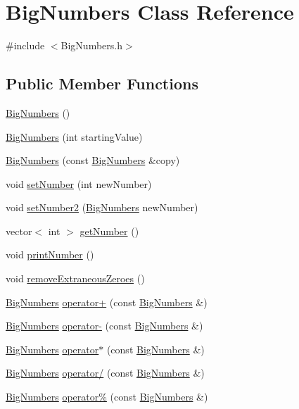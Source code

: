 \hypertarget{class_big_numbers}{}\section{Big\+Numbers Class Reference}
\label{class_big_numbers}


{\ttfamily \#include $<$Big\+Numbers.\+h$>$}

\subsection*{Public Member Functions}
\begin{DoxyCompactItemize}
\item 
\mbox{\hyperlink{class_big_numbers_af3dd82883f10f3473ac83280f26b0ad8}{Big\+Numbers}} ()
\item 
\mbox{\hyperlink{class_big_numbers_ae05f731eabe0a6a24e6a2a446bc6e494}{Big\+Numbers}} (int starting\+Value)
\item 
\mbox{\hyperlink{class_big_numbers_a5722d1b8b8e1b793bca0aa8da14e0c64}{Big\+Numbers}} (const \mbox{\hyperlink{class_big_numbers}{Big\+Numbers}} \&copy)
\item 
void \mbox{\hyperlink{class_big_numbers_abf400d0630712c0894101f578960b155}{set\+Number}} (int new\+Number)
\item 
void \mbox{\hyperlink{class_big_numbers_a6b9f005b46c0112d7fff0a5bc685b095}{set\+Number2}} (\mbox{\hyperlink{class_big_numbers}{Big\+Numbers}} new\+Number)
\item 
vector$<$ int $>$ \mbox{\hyperlink{class_big_numbers_ab140c7d7b759d5c27c21103d781c58d6}{get\+Number}} ()
\item 
void \mbox{\hyperlink{class_big_numbers_a1796791f2942db617426897c9cf6d9b7}{print\+Number}} ()
\item 
void \mbox{\hyperlink{class_big_numbers_a91e77188004279bd26af52d1a937c8ca}{remove\+Extraneous\+Zeroes}} ()
\item 
\mbox{\hyperlink{class_big_numbers}{Big\+Numbers}} \mbox{\hyperlink{class_big_numbers_a9571bdce2b62424020c3cd18f8fcd35d}{operator+}} (const \mbox{\hyperlink{class_big_numbers}{Big\+Numbers}} \&)
\item 
\mbox{\hyperlink{class_big_numbers}{Big\+Numbers}} \mbox{\hyperlink{class_big_numbers_ac8b9a03b6c074439aaa29417b743189b}{operator-\/}} (const \mbox{\hyperlink{class_big_numbers}{Big\+Numbers}} \&)
\item 
\mbox{\hyperlink{class_big_numbers}{Big\+Numbers}} \mbox{\hyperlink{class_big_numbers_ab4a10f12b8f3712f4a5d71f5290bc0f9}{operator$\ast$}} (const \mbox{\hyperlink{class_big_numbers}{Big\+Numbers}} \&)
\item 
\mbox{\hyperlink{class_big_numbers}{Big\+Numbers}} \mbox{\hyperlink{class_big_numbers_aee7e1cdae1742cd7b6b1e469e1fda743}{operator/}} (const \mbox{\hyperlink{class_big_numbers}{Big\+Numbers}} \&)
\item 
\mbox{\hyperlink{class_big_numbers}{Big\+Numbers}} \mbox{\hyperlink{class_big_numbers_a0f8b955476c8d9ee64627e20ca771859}{operator\%}} (const \mbox{\hyperlink{class_big_numbers}{Big\+Numbers}} \&)
\end{DoxyCompactItemize}


